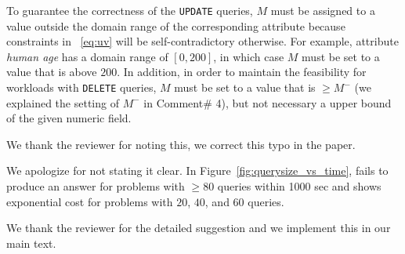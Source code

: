 

\begin{quote}
\end{quote}

To guarantee the correctness of the \texttt{UPDATE} queries, $M$ must 
be assigned to a value outside the domain range of the corresponding attribute 
because constraints in ~\ref{eq:uv} will be self-contradictory otherwise. For example, 
attribute \textit{human age} has a domain range of $[0, 200]$, in which case $M$ must be 
set to a value that is above $200$. 
In addition, in order to maintain the feasibility for workloads with \texttt{DELETE}
queries, $M$ must be set to a value that is $\geq M^-$ (we explained
the setting of $M^-$ in Comment\# 4), but not necessary a 
upper bound of the given numeric field. 



\begin{quote}
\end{quote}

We thank the reviewer for noting this, we correct this typo in the paper. 


\begin{quote}
\end{quote}
We apologize for not stating it clear. In Figure~\ref{fig:querysize_vs_time}, \naive fails to produce an answer
 for problems with $\geq 80$ queries within 1000 sec and \naive shows exponential cost for problems with $20$, $40$, and $60$ queries. 


\begin{quote}
\end{quote}

We thank the reviewer for the detailed suggestion and we implement this in our main text. 

